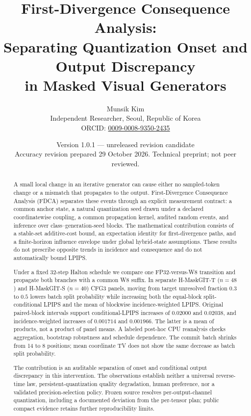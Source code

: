 \documentclass[11pt,a4paper]{article}
\title{\bfseries First-Divergence Consequence Analysis:\\
Separating Quantization Onset and Output Discrepancy\\
in Masked Visual Generators}
\author{Munsik Kim\\\small Independent Researcher, Seoul, Republic of Korea\\
\small ORCID: \href{https://orcid.org/0009-0008-9350-2435}{0009-0008-9350-2435}}
\date{Version 1.0.1 --- unreleased revision candidate\\[2pt]
\small Accuracy revision prepared 29 October 2026. Technical preprint; not peer reviewed.}
\theoremstyle{plain}
\theoremstyle{definition}
\theoremstyle{remark}
\begin{document}
\maketitle
\thispagestyle{fancy}

\begin{abstract}
\noindent
A small local change in an iterative generator can cause either no sampled-token
change or a mismatch that propagates to the output. First-Divergence Consequence
Analysis (FDCA) separates these events through an explicit measurement contract:
a common anchor state, a natural quantization seed drawn under a declared
coordinatewise coupling, a common propagation kernel, audited random events,
and inference over class--generation-seed blocks. The mathematical contribution
consists of a stable-set additive-cost bound, an expectation identity for
first-divergence paths, and a finite-horizon influence envelope under global
hybrid-state assumptions. These results do not prescribe opposite trends in
incidence and consequence and do not automatically bound LPIPS.

Under a fixed 32-step Halton schedule we compare one FP32-versus-W8 transition
and propagate both branches with a common W8 suffix. In separate H-MaskGIT-T
($n=48$) and H-MaskGIT-S ($n=40$) CFG3 panels, moving from target unresolved
fraction $0.3$ to $0.5$ lowers batch split probability while increasing both the
equal-block split-conditional LPIPS and the mean of blockwise incidence-weighted
LPIPS. Original paired-block intervals support conditional-LPIPS increases of
$0.02000$ and $0.02038$, and incidence-weighted increases of $0.001714$ and
$0.001966$. The latter is a mean of products, not a product of panel means.
A labeled post-hoc CPU reanalysis checks aggregation, bootstrap robustness and
schedule dependence. The commit batch shrinks from 14 to 8 positions; mean
coordinate TV does not show the same decrease as batch split probability.

The contribution is an auditable separation of onset and conditional output
discrepancy in this intervention. The observations establish neither a universal
reverse-time law, persistent-quantization quality degradation, human preference,
nor a validated precision-selection policy. Frozen source resolves per-output-channel quantization, including a documented
deviation from the per-tensor plan; public compact evidence retains further
reproducibility limits.
\end{abstract}

\noindent{}
\end{document}
